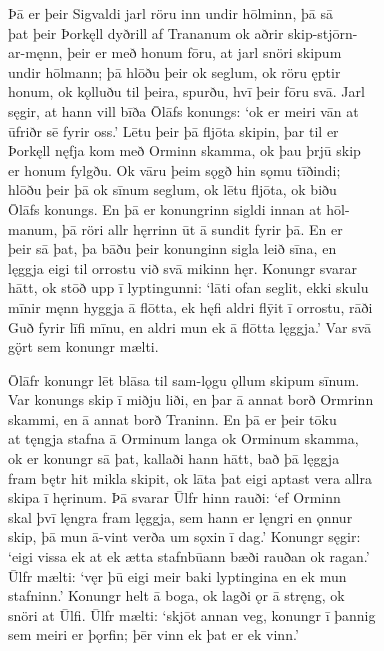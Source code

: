 \documentclass[12pt,letterpaper]{book}
\begin{document}
\begin{linenumbers}
Þā er þeir Sigvaldi jarl röru inn undir hōlminn, þā sā\\
þat þeir Þorkęll dyðrill af Trananum ok aðrir skip-stjōrn-\\
ar-męnn, þeir er með honum fōru, at jarl snöri skipum\\
undir hōlmann; þā hlōðu þeir ok seglum, ok röru ęptir\\
honum, ok kǫlluðu til þeira, spurðu, hvī þeir fōru svā.  Jarl\\
sęgir, at hann vill bīða Ōlāfs konungs: `ok er meiri vān at\\
ūfriðr sē fyrir oss.'  Lētu þeir þā fljōta skipin, þar til er\\
Þorkęll nęfja kom með Orminn skamma, ok þau þrjū skip\\
er honum fylgðu.  Ok vāru þeim sǫgð hin sǫmu tīðindi;\\
hlōðu þeir þā ok sīnum seglum, ok lētu fljōta, ok biðu\\
Ōlāfs konungs.  En þā er konungrinn sigldi innan at hōl-\\
manum, þā röri allr hęrrinn ūt ā sundit fyrir þā.  En er\\
þeir sā þat, þa bāðu þeir konunginn sigla leið sīna, en\\
lęggja eigi til orrostu við svā mikinn hęr.  Konungr svarar\\
hātt, ok stōð upp ī lyptingunni: `lāti ofan seglit, ekki skulu\\
mīnir męnn hyggja ā flōtta, ek hęfi aldri flȳit ī orrostu, rāði\\
Guð fyrir līfi mīnu, en aldri mun ek ā flōtta lęggja.'  Var svā\\
gǫ̈rt sem konungr mælti.

Ōlāfr konungr lēt blāsa til sam-lǫgu ǫllum skipum sīnum.\\
Var konungs skip ī miðju liði, en þar ā annat borð Ormrinn\\
skammi, en ā annat borð Traninn.  En þā er þeir tōku\\
at tęngja stafna ā Orminum langa ok Orminum skamma,\\
ok er konungr sā þat, kallaði hann hātt, bað þā lęggja\\
fram bętr hit mikla skipit, ok lāta þat eigi aptast vera allra\\
skipa ī hęrinum.  Þā svarar Ūlfr hinn rauði: `ef Orminn\\
skal þvī lęngra fram lęggja, sem hann er lęngri en ǫnnur\\
skip, þā mun ā-vint verða um sǫxin ī dag.'  Konungr sęgir:\\
`eigi vissa ek at ek ætta stafnbūann bæði rauðan ok ragan.'\\
Ūlfr mælti: `vęr þū eigi meir baki lyptingina en ek mun\\
stafninn.'  Konungr helt ā boga, ok lagði ǫr ā stręng, ok\\
snöri at Ūlfi.  Ūlfr mælti: `skjōt annan veg, konungr ī þannig\\
sem meiri er þǫrfin; þēr vinn ek þat er ek vinn.'


\end{linenumbers}
\end{document}
